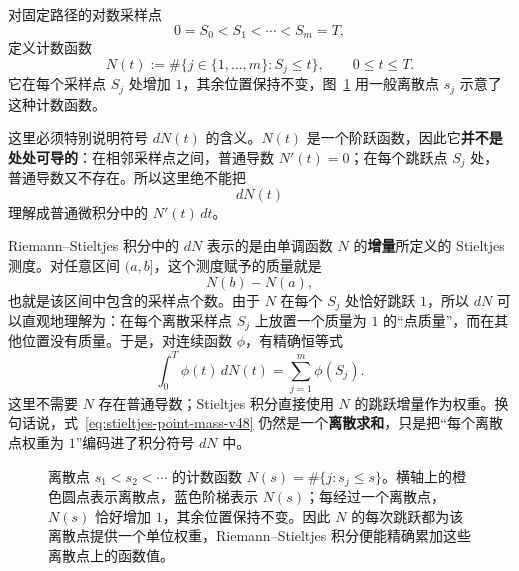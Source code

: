 \documentclass[11pt,a4paper]{article}
\begin{document}
对固定路径的对数采样点
\[
0=S_0<S_1<\cdots<S_m=T,
\]
定义计数函数
\begin{equation}
N(t):=\#\{j\in\{1,\ldots,m\}:S_j\le t\},
\qquad 0\le t\le T.
\label{eq:path-counting-function-v36}
\end{equation}
它在每个采样点 $S_j$ 处增加 $1$，其余位置保持不变，图~\ref{fig:counting-function} 用一般离散点 $s_j$ 示意了这种计数函数。

这里必须特别说明符号 $dN(t)$ 的含义。$N(t)$ 是一个阶跃函数，因此它\textbf{并不是处处可导的}：在相邻采样点之间，普通导数 $N'(t)=0$；在每个跳跃点 $S_j$ 处，普通导数又不存在。所以这里绝不能把
\[
dN(t)
\]
理解成普通微积分中的 $N'(t)\,dt$。

Riemann--Stieltjes 积分中的 $dN$ 表示的是由单调函数 $N$ 的\textbf{增量}所定义的 Stieltjes 测度。对任意区间 $(a,b]$，这个测度赋予的质量就是
\[
N(b)-N(a),
\]
也就是该区间中包含的采样点个数。由于 $N$ 在每个 $S_j$ 处恰好跳跃 $1$，所以 $dN$ 可以直观地理解为：在每个离散采样点 $S_j$ 上放置一个质量为 $1$ 的“点质量”，而在其他位置没有质量。于是，对连续函数 $\phi$，有精确恒等式
\begin{equation}
\int_{0}^{T}\phi(t)\,dN(t)
=
\sum_{j=1}^{m}\phi(S_j).
\label{eq:stieltjes-point-mass-v48}
\end{equation}
这里不需要 $N$ 存在普通导数；Stieltjes 积分直接使用 $N$ 的跳跃增量作为权重。换句话说，式~\eqref{eq:stieltjes-point-mass-v48} 仍然是一个\textbf{离散求和}，只是把“每个离散点权重为 $1$”编码进了积分符号 $dN$ 中。

\begin{figure}[tbp]
\centering
{}
\caption{离散点 $s_1<s_2<\cdots$ 的计数函数 $N(s)=\#\{j:s_j\le s\}$。横轴上的橙色圆点表示离散点，蓝色阶梯表示 $N(s)$；每经过一个离散点，$N(s)$ 恰好增加 $1$，其余位置保持不变。因此 $N$ 的每次跳跃都为该离散点提供一个单位权重，Riemann--Stieltjes 积分便能精确累加这些离散点上的函数值。}
\label{fig:counting-function}
\end{figure}
\end{document}
